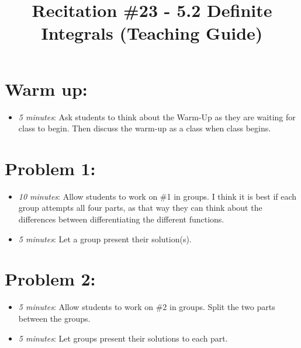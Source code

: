 \documentclass[handout,nooutcomes]{ximera}
\title{Recitation \#23 - 5.2 Definite Integrals (Teaching Guide)}
\begin{document}
\begin{abstract}		\end{abstract}
\maketitle


\section*{Warm up:} 
	
	\begin{itemize}
	
	\item  \emph{5 minutes}:  Ask students to think about the Warm-Up as they are waiting for class to begin.  Then discuss the warm-up as a class when class begins.
	
	
	
	\end{itemize}


\section*{Problem 1:}

	\begin{itemize}
	
	\item  \emph{10 minutes}:  Allow students to work on \#1 in groups.  I think it is best if each group attempts all four parts, as that way they can think about the differences between differentiating the different functions.
	
	\item  \emph{5 minutes}:  Let a group present their solution(s).
	
	\end{itemize}



\section*{Problem 2:}

	\begin{itemize}
	
	\item  \emph{5 minutes}:  Allow students to work on \#2 in groups.  Split the two parts between the groups.
		
	\item  \emph{5 minutes}:  Let groups present their solutions to each part.
			
	\end{itemize}
	
\end{document}
